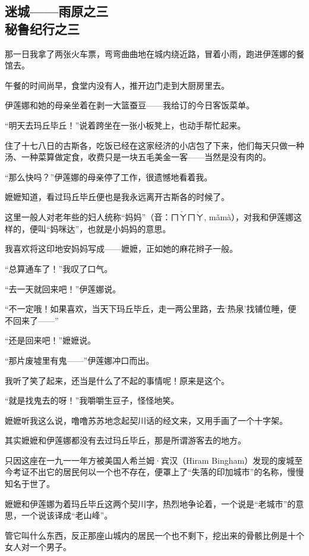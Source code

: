 \subsection{迷城——雨原之三\\\small{秘鲁纪行之三}}

\par 那一日我拿了两张火车票，弯弯曲曲地在城内绕近路，冒着小雨，跑进伊莲娜的餐馆去。
\par 午餐的时间尚早，食堂内没有人，推开边门走到大厨房里去。
\par 伊莲娜和她的母亲坐着在剥一大篮蚕豆——我给订的今日客饭菜单。
\par “明天去玛丘毕丘！”说着跨坐在一张小板凳上，也动手帮忙起来。
\par 住了十七八日的古斯各，吃饭已经在这家经济的小店包了下来，他们每天只做一种汤、一种菜算做定食，收费只是一块五毛美金一客——当然是没有肉的。
\par “那么快吗？”伊莲娜的母亲停了工作，很遗憾地看着我。
\par 嬷嬷知道，看过玛丘毕丘便也是我永远离开古斯各的时候了。
\par 这里一般人对老年些的妇人统称“妈妈”（音：$\text{ㄇ}\check{\text{ㄚ}}\text{ㄇ}\grave{\text{ㄚ}}$, mǎmà），对我和伊莲娜这样的，便叫“妈咪达”，也就是小妈妈的意思。
\par 我喜欢将这印地安妈妈写成——嬷嬷，正如她的麻花辫子一般。
\par “总算通车了！”我叹了口气。
\par “去一天就回来吧！”伊莲娜说。
\par “不一定哦！如果喜欢，当天下玛丘毕丘，走一两公里路，去‘热泉’找铺位睡，便不回来了——”
\par “还是回来吧！”嬷嬷说。
\par “那片废墟里有鬼——”伊莲娜冲口而出。
\par 我听了笑了起来，还当是什么了不起的事情呢！原来是这个。
\par “就是找鬼去的呀！”我嚼嚼生豆子，怪怪地笑。
\par 嬷嬷听我这么说，噜噜苏苏地念起契川话的经文来，又用手画了一个十字架。
\par 其实嬷嬷和伊莲娜都没有去过玛丘毕丘，那是所谓游客去的地方。
\par 只因这座在一九一一年方被美国人希兰姆·宾汉（Hiram Bingham）发现的废城至今考证不出它的居民何以一个也不存在，便罩上了“失落的印加城市”的名称，慢慢知名于世了。
\par 嬷嬷和伊莲娜为着玛丘毕丘这两个契川字，热烈地争论着，一个说是“老城市”的意思，一个说该译成“老山峰”。
\par 管它叫什么东西，反正那座山城内的居民一个也不剩下，挖出来的骨骸比例是十个女人对一个男子。
